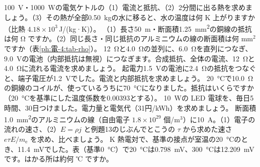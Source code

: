 \bkendproblems
{}
\bkproblem \qty{100}{V}・\qty{1000}{W}の電気ケトルの（1）電流と抵抗、（2）2分間に出る熱を求めましょう。（3）その熱が全部\qty{0.50}{kg}の水に移ると、水の温度は何 K 上がりますか（比熱 $4.18\times10^3$\,J/(kg·K)）。
\bkproblem （1）長さ\qty{50}{m}・断面積\qty{1.25}{mm^2}の銅線の抵抗は何 Ω ですか。（2）同じ長さ・同じ抵抗のアルミニウムの線の断面積は何 mm$^2$ ですか（表\ref{ph:電-4:tab-rho}）。
\bkproblem \qty{12}{\ohm}と\qty{4.0}{\ohm}の並列に、\qty{6.0}{\ohm}を直列につなぎ、\qty{9.0}{V}の電池（内部抵抗は無視）につなぎます。合成抵抗、全体の電流、\qty{12}{\ohm}と\qty{4.0}{\ohm}に流れる電流を求めましょう。
\bkproblem 起電力\qty{1.5}{V}の電池に\qty{2.4}{\ohm}の抵抗をつなぐと、端子電圧が\qty{1.2}{V}でした。電流と内部抵抗を求めましょう。
\bkproblem \qty{20}{\celsius}で\qty{10.0}{\ohm}の銅線のコイルが、使っているうちに\qty{70}{\celsius}になりました。抵抗はいくらですか（\qty{20}{\celsius}を基準にした温度係数を0.00393とする）。
\bkproblem \qty{10}{W}の LED 電球を、毎日5時間、30日つけました。電力量と電気代（31円/kWh）を求めましょう。
\bkproblem 断面積\qty{1.0}{mm^2}のアルミニウムの線（自由電子 $1.8\times10^{29}$ 個/m$^3$）に\qty{10}{A}。（1）電子の流れの速さ、（2）$E=\rho j$ と例題13のじぶんでとこうの $\tau$ から求めた速さ $e\tau E/m_{\mathrm e}$ を求め、比べましょう。
\bkproblem K 熱電対で、基準の接点が室温の\qty{20}{\celsius}のとき、\qty{11.4}{mV}でした。表（基準\qty{0}{\celsius}）で\qty{20}{\celsius}は\qty{0.798}{mV}、\qty{300}{\celsius}は\qty{12.209}{mV}です。はかる所は約何 ℃ ですか。
